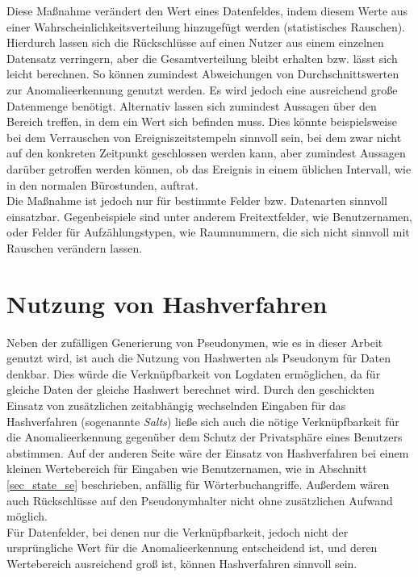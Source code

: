 Diese Maßnahme verändert den Wert eines Datenfeldes, indem diesem Werte aus einer Wahrscheinlichkeitsverteilung hinzugefügt werden (statistisches Rauschen). 
Hierdurch lassen sich die Rückschlüsse auf einen Nutzer aus einem einzelnen Datensatz verringern, aber die Gesamtverteilung bleibt erhalten bzw. lässt sich leicht berechnen. 
So können zumindest Abweichungen von Durchschnittswerten zur Anomalieerkennung genutzt werden. 
Es wird jedoch eine ausreichend große Datenmenge benötigt. Alternativ lassen sich zumindest Aussagen über den Bereich treffen, in dem ein Wert sich befinden muss. Dies könnte beispielsweise bei dem Verrauschen von Ereigniszeitstempeln sinnvoll sein, bei dem zwar nicht auf den konkreten Zeitpunkt geschlossen werden kann, aber zumindest Aussagen darüber getroffen werden können, ob das Ereignis in einem üblichen Intervall, wie in den normalen Bürostunden, auftrat.\\
Die Maßnahme ist jedoch nur für bestimmte Felder bzw. Datenarten sinnvoll einsatzbar. Gegenbeispiele sind unter anderem Freitextfelder, wie Benutzernamen, oder Felder für Aufzählungstypen, wie Raumnummern, die sich nicht sinnvoll mit Rauschen verändern lassen. 

\section{Nutzung von Hashverfahren}

Neben der zufälligen Generierung von Pseudonymen, wie es in dieser Arbeit genutzt wird, ist auch die Nutzung von Hashwerten als Pseudonym für Daten denkbar. Dies würde die Verknüpfbarkeit von Logdaten ermöglichen, da für gleiche Daten der gleiche Hashwert berechnet wird. Durch den geschickten Einsatz von zusätzlichen zeitabhängig wechselnden Eingaben für das Hashverfahren (sogenannte \textit{Salts}) ließe sich auch die nötige Verknüpfbarkeit für die Anomalieerkennung gegenüber dem Schutz der Privatsphäre eines Benutzers abstimmen. Auf der anderen Seite wäre der Einsatz von Hashverfahren bei einem kleinen Wertebereich für Eingaben wie Benutzernamen, wie in Abschnitt \ref{sec_state_se} beschrieben, anfällig für Wörterbuchangriffe. Außerdem wären auch Rückschlüsse auf den Pseudonymhalter nicht ohne zusätzlichen Aufwand möglich.\\
Für Datenfelder, bei denen nur die Verknüpfbarkeit, jedoch nicht der ursprüngliche Wert für die Anomalieerkennung entscheidend ist, und deren Wertebereich ausreichend groß ist, können Hashverfahren sinnvoll sein. 

